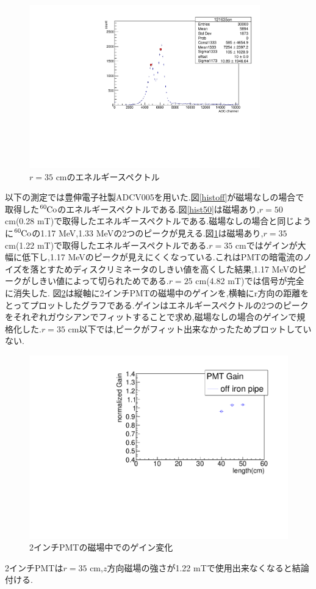 \begin{figure}[tbp]
	\centering
	\includegraphics[angle=-90,width=10cm]{fig/iguchi/121635on.pdf}
	\caption{$r=35$ cmのエネルギースペクトル}
	\label{hist35}
\end{figure}

以下の測定では豊伸電子社製ADC\hspace{3pt}V005を用いた.図\ref{histoff}が磁場なしの場合で取得した$\ce{^{60}Co}$のエネルギースペクトルである.図\ref{hist50}は磁場あり,$r=50$ cm(0.28 mT)で取得したエネルギースペクトルである.磁場なしの場合と同じように$\ce{^{60}Co}$の1.17 MeV,1.33 MeVの2つのピークが見える.図\ref{hist35}は磁場あり,$r=35$ cm(1.22 mT)で取得したエネルギースペクトルである.$r=35$ cmではゲインが大幅に低下し,1.17 MeVのピークが見えにくくなっている.これはPMTの暗電流のノイズを落とすためディスクリミネータのしきい値を高くした結果,1.17 MeVのピークがしきい値によって切られためである.$r=25$ cm(4.82 mT)では信号が完全に消失した.
図\ref{plot2inchoff}は縦軸に2インチPMTの磁場中のゲインを,横軸にr方向の距離をとってプロットしたグラフである.ゲインはエネルギースペクトルの2つのピークをそれぞれガウシアンでフィットすることで求め,磁場なしの場合のゲインで規格化した.$r=35$ cm以下では,ピークがフィット出来なかったためプロットしていない.

\begin{figure}[tbp]
	\centering
		\includegraphics[angle=-90,width=15cm]{fig/iguchi/plot2inchPMT.pdf}
	\caption{2インチPMTの磁場中でのゲイン変化}
	\label{plot2inchoff}
\end{figure}
2インチPMTは$r=35$ cm,$z$方向磁場の強さが1.22 mTで使用出来なくなると結論付ける.

